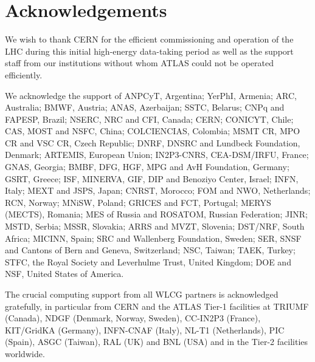 \documentclass[11pt,a4paper,dvips]{article}
\begin{document}
\section{Acknowledgements}

We wish to thank CERN for the efficient commissioning and operation of the LHC during this initial high-energy data-taking period as well as the support staff from our institutions without whom ATLAS could not be operated efficiently.

We acknowledge the support of ANPCyT, Argentina; YerPhI, Armenia; ARC, Australia; BMWF, Austria; ANAS, Azerbaijan; SSTC, Belarus; CNPq and FAPESP, Brazil; NSERC, NRC and CFI, Canada; CERN; CONICYT, Chile; CAS, MOST and NSFC, China; COLCIENCIAS, Colombia; MSMT CR, MPO CR and VSC CR, Czech Republic; DNRF, DNSRC and Lundbeck Foundation, Denmark; ARTEMIS, European Union; IN2P3-CNRS, CEA-DSM/IRFU, France; GNAS, Georgia; BMBF, DFG, HGF, MPG and AvH Foundation, Germany; GSRT, Greece; ISF, MINERVA, GIF, DIP and Benoziyo Center, Israel; INFN, Italy; MEXT and JSPS, Japan; CNRST, Morocco; FOM and NWO, Netherlands; RCN, Norway;  MNiSW, Poland; GRICES and FCT, Portugal;  MERYS (MECTS), Romania;  MES of Russia and ROSATOM, Russian Federation; JINR; MSTD, Serbia; MSSR, Slovakia; ARRS and MVZT, Slovenia; DST/NRF, South Africa; MICINN, Spain; SRC and Wallenberg Foundation, Sweden; SER,  SNSF and Cantons of Bern and Geneva, Switzerland;  NSC, Taiwan; TAEK, Turkey; STFC, the Royal Society and Leverhulme Trust, United Kingdom; DOE and NSF, United States of America.  

The crucial computing support from all WLCG partners is acknowledged gratefully, in particular from CERN and the ATLAS Tier-1 facilities at TRIUMF (Canada), NDGF (Denmark, Norway, Sweden), CC-IN2P3 (France), KIT/GridKA (Germany), INFN-CNAF (Italy), NL-T1 (Netherlands), PIC (Spain), ASGC (Taiwan), RAL (UK) and BNL (USA) and in the Tier-2 facilities worldwide.
\end{document}
